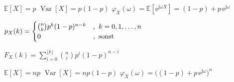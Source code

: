 \documentclass[8pt,a4paper,landscape]{extarticle}
\begin{document}
\begin{multicols*}{6}
\vspace{14pt}
\vspace{2pt}
\vspace{-3pt}
\fsubcols
{\CheatsheetItemListStart
{}
\CheatsheetItemListEnd
$\mathbb{E}[X] = p$
}
{
\CheatsheetItemListStart
{}
\CheatsheetItemListEnd
$\operatorname{Var}[X] = p(1-p)$
}
\vspace{4pt}
\CheatsheetItemListStart
{}
\CheatsheetItemListEnd
$\varphi_X(\omega) = \mathbb{E}[\mathrm{e}^{\mathrm{j}\omega X}] = (1-p) + p \,\mathrm{e}^{\mathrm{j}\omega}$



\vspace{6pt}
\begin{varwidth}{\dimexpr{}\fboxsep\relax}
  \ensuremath{
    \begin{array}{lll}
      \hspace*{-5pt}
      p_X(k) = \begin{cases}
        {n \choose k} p^k (1-p)^{n-k} & ,\ k = 0,1,\ldots,n \\
        0 & ,\ \text{sonst}
      \end{cases} \\ 
      \end{array}
  }
\end{varwidth}
\vspace{8pt}
\par
$F_X(k) = \sum_{i=0}^{\lfloor k\rfloor} {n \choose i} p^i (1-p)^{n-i}$
    

\vspace{26pt}
\vspace{2pt}
\fsubcols
{\CheatsheetItemListStart
{}
\CheatsheetItemListEnd
$\mathbb{E}[X] = np$
}
{
\CheatsheetItemListStart
{}
\CheatsheetItemListEnd
$\operatorname{Var}[X] = np(1-p)$
}
\vspace{4pt}
\CheatsheetItemListStart
{}
\CheatsheetItemListEnd
$\varphi_X(\omega) = \bigl((1-p) + p \,\mathrm{e}^{\mathrm{j}\omega}\bigr)^n$



\end{multicols*}
\end{document}
